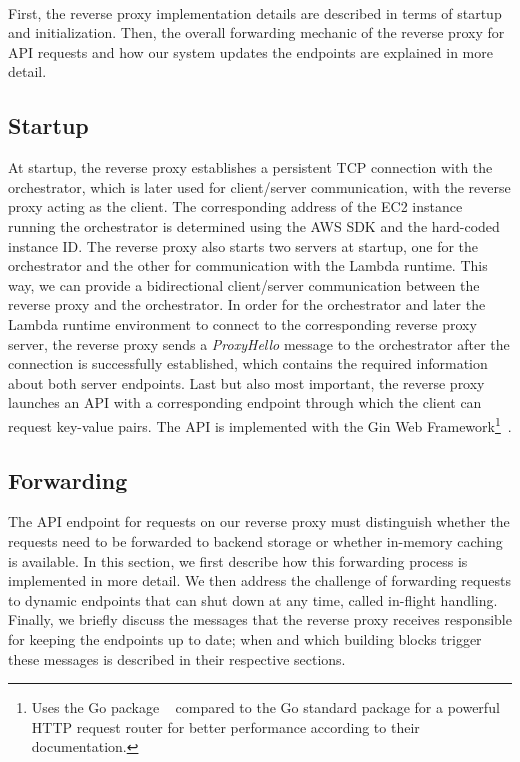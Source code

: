 ~\\ 
First, the reverse proxy implementation details are described in terms of startup and initialization. Then, the overall forwarding mechanic of the reverse proxy for API requests and how our system updates the endpoints are explained in more detail. 

\subsection{Startup}
At startup, the reverse proxy establishes a persistent TCP connection with the orchestrator, which is later used for client/server communication, with the reverse proxy acting as the client. The corresponding address of the EC2 instance running the orchestrator is determined using the AWS SDK and the hard-coded instance ID. The reverse proxy also starts two servers at startup, one for the orchestrator and the other for communication with the Lambda runtime. This way, we can provide a bidirectional client/server communication between the reverse proxy and the orchestrator. In order for the orchestrator and later the Lambda runtime environment to connect to the corresponding reverse proxy server, the reverse proxy sends a \emph{ProxyHello} message to the orchestrator after the connection is successfully established, which contains the required information about both server endpoints. Last but also most important, the reverse proxy launches an API with a corresponding  endpoint through which the client can request key-value pairs. The API is implemented with the Gin Web Framework\footnote{Uses the Go package ~\cite{schmidt_httprouter_2022} compared to the Go standard package  for a powerful HTTP request router for better performance according to their documentation.}~\cite{noauthor_gin_2022}.

\subsection{Forwarding}
\label{subsec:forwarding}
The API endpoint for  requests on our reverse proxy must distinguish whether the requests need to be forwarded to backend storage or whether in-memory caching is available. In this section, we first describe how this forwarding process is implemented in more detail. We then address the challenge of forwarding requests to dynamic endpoints that can shut down at any time, called in-flight handling. Finally, we briefly discuss the messages that the reverse proxy receives responsible for keeping the endpoints up to date; when and which building blocks trigger these messages is described in their respective sections.

